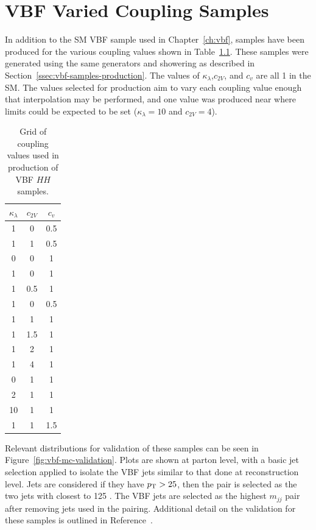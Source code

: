 \chapter{VBF Varied Coupling Samples}\label{app:vbf-couplings}

In addition to the \gls{SM} VBF \hh sample used in Chapter~\ref{ch:vbf}, samples have been produced for the various coupling values shown in Table~\ref{tab:vbf-coupling-samples}. These samples were generated using the same generators and showering as described in Section~\ref{ssec:vbf-samples-production}. The values of $\kappa_\lambda$,$c_{2V}$, and $c_{v}$ are all 1 in the \gls{SM}. The values selected for production aim to vary each coupling value enough that interpolation may be performed, and one value was produced near where limits could be expected to be set ($\kappa_\lambda = 10$ and $c_{2V}=4$).

\begin{table}[htbp]
    \centering
    \caption{Grid of coupling values used in production of VBF $HH$ samples.}
    \begin{tabular}{c|c|c}
        $\kappa_\lambda$ & $c_{2V}$ & $c_{v}$ \\
        \hline
        1 & 0 & 0.5 \\
        1 & 1 & 0.5 \\
        0 & 0 & 1 \\
        1 & 0 & 1 \\
        1 & 0.5 & 1 \\
        1 & 0 & 0.5 \\
        1 & 1 & 1 \\
        1 & 1.5 & 1 \\
        1 & 2 & 1 \\
        1 & 4 & 1 \\
        0 & 1 & 1 \\
        2 & 1 & 1 \\
        10 & 1 & 1 \\
        1 & 1 & 1.5
    \end{tabular}
    \label{tab:vbf-coupling-samples}
\end{table}

Relevant distributions for validation of these samples can be seen in Figure~\ref{fig:vbf-mc-validation}. Plots are shown at parton level, with a basic jet selection applied to isolate the VBF jets similar to that done at reconstruction level. Jets are considered if they have $p_{\text{T}} > 25$, then the \mbb pair is selected as the two jets with \mbb closest to 125 \GeV. The VBF jets are selected as the highest $m_{jj}$ pair after removing jets used in the \mbb pairing. Additional detail on the validation for these samples is outlined in Reference~\cite{mc-validation}.

